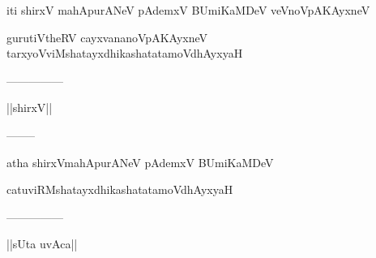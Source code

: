 \documentclass{article}
\begin{document}
\begin{center}
iti shirxV mahApurANeV pAdemxV BUmiKaMDeV veVnoVpAKAyxneV
\end{center}

\begin{center}
gurutiVtheRV cayxvananoVpAKAyxneV tarxyoVviMshatayxdhikashatatamoVdhAyxyaH
\end{center}

\begin{center}
---------------
\end{center}

\begin{center}
||shirxV||
\end{center}

\begin{center}
--------
\end{center}

\begin{center}
atha shirxVmahApurANeV pAdemxV BUmiKaMDeV
\end{center}

\begin{center}
catuviRMshatayxdhikashatatamoVdhAyxyaH
\end{center}

\begin{center}
---------------
\end{center}

\begin{center}
||sUta uvAca||
\end{center}
\end{document}
